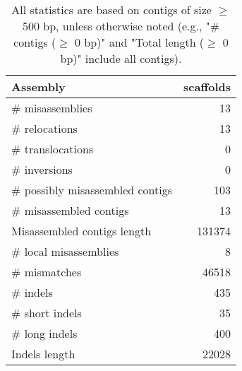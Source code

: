 \documentclass[12pt,a4paper]{article}
\begin{document}
\begin{table}[ht]
\begin{center}
\caption{All statistics are based on contigs of size $\geq$ 500 bp, unless otherwise noted (e.g., "\# contigs ($\geq$ 0 bp)" and "Total length ($\geq$ 0 bp)" include all contigs).}
\begin{tabular}{|l*{1}{|r}|}
\hline
Assembly & scaffolds \\ \hline
\# misassemblies & 13 \\ \hline
\hspace{5mm}\# relocations & 13 \\ \hline
\hspace{5mm}\# translocations & 0 \\ \hline
\hspace{5mm}\# inversions & 0 \\ \hline
\# possibly misassembled contigs & 103 \\ \hline
\# misassembled contigs & 13 \\ \hline
Misassembled contigs length & 131374 \\ \hline
\# local misassemblies & 8 \\ \hline
\# mismatches & 46518 \\ \hline
\# indels & 435 \\ \hline
\hspace{5mm}\# short indels & 35 \\ \hline
\hspace{5mm}\# long indels & 400 \\ \hline
Indels length & 22028 \\ \hline
\end{tabular}
\end{center}
\end{table}
\end{document}
